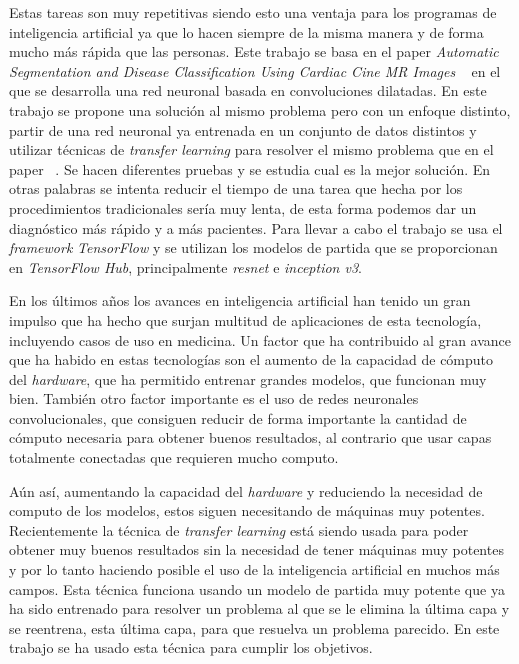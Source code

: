 \documentclass[12pt,a4paper]{article}
\begin{document}
Estas tareas son muy repetitivas siendo esto una ventaja para los programas de inteligencia artificial ya que lo hacen siempre de la misma manera y de forma mucho más rápida que las personas. Este trabajo se basa en el paper \textit{Automatic Segmentation and Disease Classification Using Cardiac Cine MR Images} ~\cite{DBLP:journals/corr/abs-1708-01141} en el que se desarrolla una red neuronal basada en convoluciones dilatadas. En este trabajo se propone una solución al mismo problema pero con un enfoque distinto, partir de una red neuronal ya entrenada en un conjunto de datos distintos y utilizar técnicas de \textit{transfer learning} para resolver el mismo problema que en el paper ~\cite{DBLP:journals/corr/abs-1708-01141}. Se hacen diferentes pruebas y se estudia cual es la mejor solución. En otras palabras se intenta reducir el tiempo de una tarea que hecha por los procedimientos tradicionales sería muy lenta, de esta forma podemos dar un diagnóstico más rápido y a más pacientes. Para llevar a cabo el trabajo se usa el \textit{framework} \textit{TensorFlow} y se utilizan los modelos de partida que se proporcionan en \textit{TensorFlow Hub}, principalmente \textit{resnet} e \textit{inception v3}.
\bigskip

En los últimos años los avances en inteligencia artificial han tenido un gran impulso que ha hecho que surjan multitud de aplicaciones de esta tecnología, incluyendo casos de uso en medicina. Un factor que ha contribuido al gran avance que ha habido en estas tecnologías son el aumento de la capacidad de cómputo del \textit{hardware}, que ha permitido entrenar grandes modelos, que funcionan muy bien. También otro factor importante es el uso de redes neuronales convolucionales, que consiguen reducir de forma importante la cantidad de cómputo necesaria para obtener buenos resultados, al contrario que usar capas totalmente conectadas que requieren mucho computo.
\bigskip

Aún así, aumentando la capacidad del \textit{hardware} y reduciendo la necesidad de computo de los modelos, estos siguen necesitando de máquinas muy potentes. Recientemente la técnica de \textit{transfer learning} está siendo usada para poder obtener muy buenos resultados sin la necesidad de tener máquinas muy potentes y por lo tanto haciendo posible el uso de la inteligencia artificial en muchos más campos. Esta técnica funciona usando un modelo de partida muy potente que ya ha sido entrenado para resolver un problema al que se le elimina la última capa y se reentrena, esta última capa, para que resuelva un problema parecido. En este trabajo se ha usado esta técnica para cumplir los objetivos.
\end{document}
